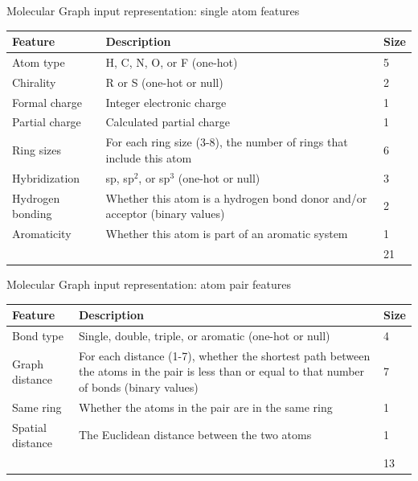 \documentclass[xetex,compress]{beamer}
\newcommand\Fontsmaller{\fontsize{9pt}{10.0}\selectfont}
\begin{document}
\begin{frame}{Molecular Graph input representation: single atom features}
  \begin{table}[htbp]
    \centering
    \begin{tabular}{@{}lp{}l@{}}
      \toprule
      Feature & Description & Size \\ \midrule
      Atom type & H, C, N, O, or F (one-hot) & 5 \\
      Chirality & R or S (one-hot or null) & 2 \\
      Formal charge & Integer electronic charge & 1 \\
      Partial charge & Calculated partial charge & 1 \\
      Ring sizes & For each ring size (3-8), the number of rings that include this atom & 6 \\
      Hybridization & sp, sp\(^2\), or sp\(^3\) (one-hot or null) & 3 \\
      Hydrogen bonding & Whether this atom is a hydrogen bond donor and/or acceptor (binary values) & 2 \\
      Aromaticity & Whether this atom is part of an aromatic system & 1 \\ \midrule
      &  & 21 \\ \bottomrule
    \end{tabular}
  \end{table}
\end{frame}

\begin{frame}{Molecular Graph input representation: atom pair features}
  \begin{table}[htbp]
    \centering
    \begin{tabular}{@{}lp{}l@{}}
      \toprule
      Feature & Description & Size \\ \midrule
      Bond type & Single, double, triple, or aromatic (one-hot or null) & 4 \\
      Graph distance & For each distance (1-7), whether the shortest path between the atoms in the pair is less than or equal to that number of bonds (binary values) & 7 \\
      Same ring & Whether the atoms in the pair are in the same ring & 1 \\
      Spatial distance & The Euclidean distance between the two atoms & 1 \\ \midrule
      &  & 13 \\ \bottomrule
    \end{tabular}
  \end{table}
\end{frame}
\end{document}

